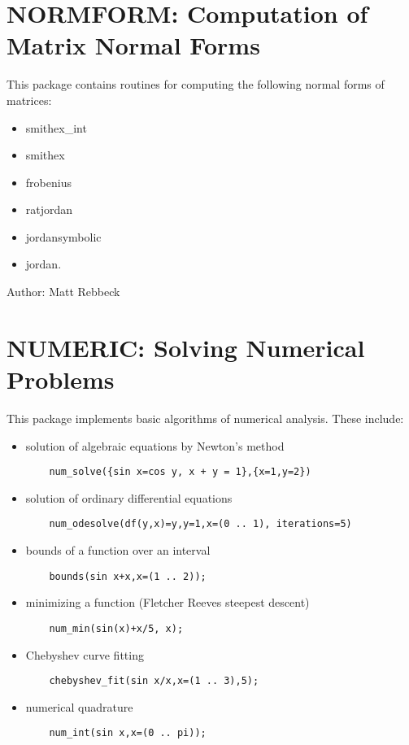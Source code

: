 \newpage

\section[NORMFORM: Computation of Matrix Normal Forms]{NORMFORM: Computation of\\Matrix Normal Forms}
\label{NORMFORM}

This package contains routines for computing the following
normal forms of matrices:
\begin{itemize}
\item smithex\_int
\item smithex
\item frobenius
\item ratjordan
\item jordansymbolic
\item jordan.
\end{itemize}

Author: Matt Rebbeck



\iffalse
\newpage

\section{NUMERIC: Solving Numerical Problems}
This package implements basic algorithms of numerical analysis.
These include:
\begin{itemize}
\item solution of algebraic equations by Newton's method
\begin{verbatim}
    num_solve({sin x=cos y, x + y = 1},{x=1,y=2})
\end{verbatim}
\item solution of ordinary differential equations
\begin{verbatim}
    num_odesolve(df(y,x)=y,y=1,x=(0 .. 1), iterations=5)
\end{verbatim}
\item bounds of a function over an interval
\begin{verbatim}
    bounds(sin x+x,x=(1 .. 2));
\end{verbatim}
\item minimizing a function (Fletcher Reeves steepest descent)
\begin{verbatim}
    num_min(sin(x)+x/5, x);
\end{verbatim}
\item Chebyshev curve fitting
\begin{verbatim}
    chebyshev_fit(sin x/x,x=(1 .. 3),5);
\end{verbatim}
\item numerical quadrature
\begin{verbatim}
    num_int(sin x,x=(0 .. pi));
\end{verbatim}
\end{itemize}

